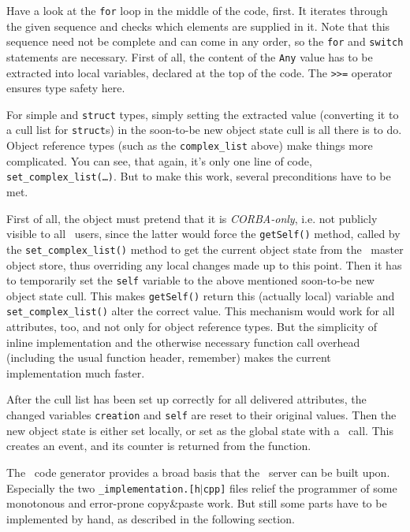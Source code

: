 Have a look at the \texttt{for} loop in the middle of the code, first. It
iterates through the given sequence and checks which elements are supplied in
it. Note that this sequence need not be complete and can come in any order,
so the \texttt{for} and \texttt{switch} statements are necessary.
First of all, the content of the \texttt{Any} value has to be extracted into
local variables, declared at the top of the code. The \texttt{>>=} operator
ensures type safety here. 

For simple and \texttt{struct} types, simply setting the extracted value
(converting it to a cull list for \texttt{struct}s) in the soon-to-be new
object state cull is all there is to do. Object reference types (such as the
\texttt{complex\_list} above) make things more complicated. You can see, that
again, it's only one line of code, \texttt{set\_complex\_list(\dots)}. But to
make this work, several preconditions have to be met.

First of all, the object must pretend that it is \emph{CORBA-only}, i.e. not
publicly visible to all \codine\ users, since the latter would force the
\texttt{getSelf()} method, called by the \texttt{set\_complex\_list()} method
to get the current object state from the \codine\ master object store, thus
overriding any local changes made up to this point. Then it has to
temporarily set the \texttt{self} variable to the above mentioned soon-to-be
new object state cull. This makes \texttt{getSelf()} return this (actually
local) variable and \texttt{set\_complex\_list()} alter the correct value.
This mechanism would work for all attributes, too, and not only for object
reference types. But the simplicity of inline implementation and the
otherwise necessary function call overhead (including the usual function
header, remember) makes the current implementation much faster.

After the cull list has been set up correctly for all delivered attributes,
the changed variables \texttt{creation} and \texttt{self} are reset to their
original values. Then the new object state is either set locally, or set as
the global state with a \codapi\ call. This creates an event, and its counter
is returned from the function.

The \idlgen\ code generator provides a broad basis that the \qidl\ server can
be built upon. Especially the two \texttt{\_implementation.[h$|$cpp]} files
relief the programmer of some monotonous and error-prone copy\&paste work.
But still some parts have to be implemented by hand, as described in the
following section.


